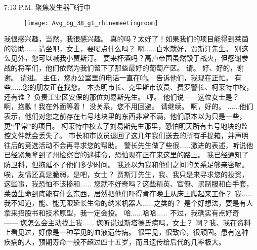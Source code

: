 \documentclass[openany]{book}
\begin{document}
7:13 P.M. 聚焦发生器飞行中
\begin{figure}[h]
    \centering
    \texttt{[image: Avg\_bg\_38\_g1\_rhinemeetingroom]}
\end{figure}
\begin{dialogue}
     我很感兴趣，当然，我很感兴趣。
     真的吗？太好了！如果我们的项目能得到莱茵的赞助......
     请坐吧，女士，要喝点什么吗？
     啊......白水就好，贾斯汀先生。
     别这么见外，您可以喊我小贾斯汀。
     要来杯酒吗？高卢帝国虽然毁于战火，但感谢参战的将军们，他们依然为我们留下了那些最好的葡萄产区。
     请。
     好、好的，谢谢。
     请进。
     主任，您办公室里的电话一直在响。
     告诉他们，我现在正忙。
     有些......您的朋友正在找您。
     本杰明市长、克里斯市议员、费罗警长、柯莱特中校，还有谁？
     负责工业区安保的那位刘易斯先生。
     哼。
     他们说——这位女士是？
     啊，抱歉！我在外面等着！
     没关系，您不用回避。
     请继续。
     啊，好的。
     ......他们表示，他们对您之前存在七号地块里的东西非常不满，他们原本以为只是一些，更“平常”的项目。
     柯莱特中校去了刘易斯先生那里，恐怕明天所有七号地块的监控文件就会丢失了。
     市长和市议员退回了这几年我们送去的所有手提箱，并声明往后的竞选活动不会再寻求您的帮助。
     警长先生做了些很......激进的表述，听说他已经紧急拿到了州检察官的逮捕令，恐怕现在正在来这里的路上。
     我已经通知了防卫科，但拖延不了他们多少时间。
     我还以为我和他们之间的关系足够亲密呢。
     唉，友情还真是脆弱，是吧，女士？
     贾斯汀先生，我、我只是来寻求您的投资，这些事，我恐怕不该掺和......
     您就不好奇吗？这些精英、官僚、黑制服和白手套，莱茵生命到底能有什么东西，居然把他们吓得肯在晚上从床上爬起来工作？
     我......我不知道，能、能无限延长生命的纳米机器人......之类的？
     是个好想法，要是有人拿来招股书和技术原型，我一定会投。
     哈......哈哈......
     不过，我确实有点好奇——
     您怎么会主动找上我......
     您听说过斯塔德氏病吗，女士？
     啊？我、我在资料上看见过，好像是一种罕见的血液遗传病。
     很罕见，很致命，很顽固。患有这种疾病的人，预期寿命一般不超过四十五岁，而且遗传给后代的几率极大。

\end{dialogue}
\end{document}
